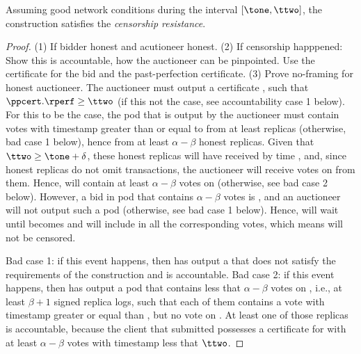 \begin{theorem}
    Assuming good network conditions during the interval $[\tone, \ttwo]$, the construction satisfies the \emph{censorship resistance}.
\end{theorem}
\begin{proof}
    (1) If bidder honest and acutioneer honest.
    (2) If censorship happpened: Show this is accountable, how the auctioneer can be pinpointed. Use the certificate for the bid and the past-perfection certificate.
    (3) Prove no-framing for honest auctioneer.
    The auctioneer must output a certificate \ppcert, such that $\ppcert.\rperf \geq \ttwo$ (if this not the case, see accountability case 1 below).
    For this to be the case, the pod \Pod that is output by the auctioneer must contain votes with timestamp greater than or equal to \ttwo from at least \alpha replicas (otherwise, bad case 1 below), hence from at least $\alpha - \beta$ honest replicas.
    Given that $\ttwo \geq \tone + \delta$, these honest replicas will have received \bid by time \ttwo, and, since honest replicas do not omit transactions, the auctioneer will receive votes on \bid from them.
    Hence, \Pod will contain at least $\alpha - \beta$ votes on \bid (otherwise, see bad case 2 below).
    However, a bid in pod that contains $\alpha - \beta$ votes is \pend, and an auctioneer will not output such a pod (otherwise, see bad case 1 below).
    Hence, \auc will wait until \bid becomes \confirmed and will include in \Pod all the corresponding votes,
    which means \bid will not be censored.
    
    Bad case 1: if this event happens, then \auc has output a \Pod that does not satisfy the requirements of the construction and \auc is accountable.
    Bad case 2: if this event happens, then \auc has output a pod \Pod that contains less that $\alpha - \beta$ votes on \bid, i.e., at least $\beta + 1$ signed replica logs, such that each of them contains a vote with timestamp greater or equal than \ttwo, but no vote on \bid. 
    At least one of those replicas is accountable,
    because the client that submitted \bid possesses a certificate \txcert for \bid with at least $\alpha - \beta$ votes with timestamp less that $\ttwo$. 
\end{proof}

